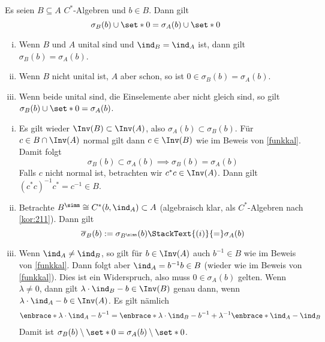 \begin{korollar}[label=korr:220,{name=[Spektrum in C*-Unteralgebren]}]
	Es seien $B \subseteq A$  $C^*$-Algebren und $b \in B$. Dann gilt
	\[
		\sigma_B(b) \cup \set*{0} = \sigma_A(b) \cup \set*{0}
	\]
	\begin{enumerate}[(i),itemsep=0pt]
		\item Wenn $B$ und $A$ unital sind und $\ind_B=\ind_A$ ist, dann gilt $\sigma_B(b) = \sigma_A(b)$.
		\item Wenn $B$ nicht unital ist, $A$ aber schon, so ist $0 \in \sigma_B(b) = \sigma_A(b)$. 
		\item Wenn beide unital sind, die Einselemente aber nicht gleich sind, so gilt $\sigma_B(b) \cup \set*{0} = \sigma_A(b)$.
	\end{enumerate}
\end{korollar}
\begin{beweis} \leavevmode
	\begin{enumerate}[(i)]
		\item Es gilt wieder $\Inv(B) \subset \Inv(A)$, also $\sigma_A(b) \subset \sigma_B(b)$.
		Für $c \in B \cap \Inv(A)$ normal gilt dann $c \in \Inv(B)$ wie im Beweis von \autoref{funkkal}. Damit folgt
		\[
			\sigma_B(b) \subset \sigma_A(b) \implies \sigma_B(b) = \sigma_A(b)
		\]
		Falls $c$ nicht normal ist, betrachten wir $c^*c \in \Inv(A)$. Dann gilt $(c^*c)^{-1} c^* = c^{-1} \in B$.
		\item Betrachte $B^\simm \cong C^*(b,\ind_A) \subset A$ (algebraisch klar, als $C^*$-Algebren nach \autoref{kor:211}). Dann gilt
		\[
			\overline{\sigma}_B(b) := \sigma_{B^\simm}(b) \StackText{(i)}{=}\sigma_A(b)
		\]
		\item Wenn $\ind_A \neq \ind_B$, so gilt für $b \in \Inv(A)$ auch $b^{-1}\in B$ wie im Beweis von \autoref{funkkal}. 
		Dann folgt aber $\ind_A = b^{-1}b\in B$ (wieder wie im Beweis von \ref{funkkal}). 
		Dies ist ein Widerspruch, also muss $0 \in \sigma_A(b)$ gelten. 
		Wenn $\lambda \neq 0$, dann gilt $\lambda \cdot \ind_B - b \in \Inv(B)$ genau dann, wenn $\lambda \cdot \ind_A -b \in \Inv(A)$. 
		Es gilt nämlich
		\begin{align}
			\enbrace*{\lambda \cdot \ind_A- b}^{-1} = \enbrace*{\lambda \cdot \ind_B -b}^{-1} + \lambda^{-1}\enbrace*{\ind_A-\ind_B}
		\end{align}
		Damit ist $\sigma_B(b) \setminus \set*{0} = \sigma_A(b) \setminus \set*{0}$. \qedhere
	\end{enumerate}
\end{beweis}
\newpage

